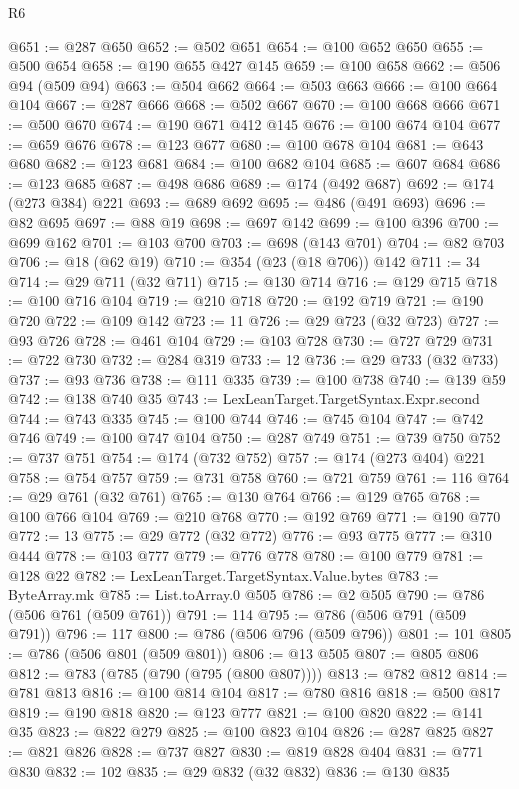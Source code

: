 \begin{lexlean}{R6}
\begin{coremodule}
@651 := @287 @650
@652 := @502 @651
@654 := @100 @652 @650
@655 := @500 @654
@658 := @190 @655 @427 @145
@659 := @100 @658
@662 := @506 @94 (@509 @94)
@663 := @504 @662
@664 := @503 @663
@666 := @100 @664 @104
@667 := @287 @666
@668 := @502 @667
@670 := @100 @668 @666
@671 := @500 @670
@674 := @190 @671 @412 @145
@676 := @100 @674 @104
@677 := @659 @676
@678 := @123 @677
@680 := @100 @678 @104
@681 := @643 @680
@682 := @123 @681
@684 := @100 @682 @104
@685 := @607 @684
@686 := @123 @685
@687 := @498 @686
@689 := @174 (@492 @687)
@692 := @174 (@273 @384) @221
@693 := @689 @692
@695 := @486 (@491 @693)
@696 := @82 @695
@697 := @88 @19
@698 := @697 @142
@699 := @100 @396
@700 := @699 @162
@701 := @103 @700
@703 := @698 (@143 @701)
@704 := @82 @703
@706 := @18 (@62 @19)
@710 := @354 (@23 (@18 @706)) @142
@711 := 34
@714 := @29 @711 (@32 @711)
@715 := @130 @714
@716 := @129 @715
@718 := @100 @716 @104
@719 := @210 @718
@720 := @192 @719
@721 := @190 @720
@722 := @109 @142
@723 := 11
@726 := @29 @723 (@32 @723)
@727 := @93 @726
@728 := @461 @104
@729 := @103 @728
@730 := @727 @729
@731 := @722 @730
@732 := @284 @319
@733 := 12
@736 := @29 @733 (@32 @733)
@737 := @93 @736
@738 := @111 @335
@739 := @100 @738
@740 := @139 @59
@742 := @138 @740 @35
@743 := LexLeanTarget.TargetSyntax.Expr.second
@744 := @743 @335
@745 := @100 @744
@746 := @745 @104
@747 := @742 @746
@749 := @100 @747 @104
@750 := @287 @749
@751 := @739 @750
@752 := @737 @751
@754 := @174 (@732 @752)
@757 := @174 (@273 @404) @221
@758 := @754 @757
@759 := @731 @758
@760 := @721 @759
@761 := 116
@764 := @29 @761 (@32 @761)
@765 := @130 @764
@766 := @129 @765
@768 := @100 @766 @104
@769 := @210 @768
@770 := @192 @769
@771 := @190 @770
@772 := 13
@775 := @29 @772 (@32 @772)
@776 := @93 @775
@777 := @310 @444
@778 := @103 @777
@779 := @776 @778
@780 := @100 @779
@781 := @128 @22
@782 := LexLeanTarget.TargetSyntax.Value.bytes
@783 := ByteArray.mk
@785 := List.toArray.{0} @505
@786 := @2 @505
@790 := @786 (@506 @761 (@509 @761))
@791 := 114
@795 := @786 (@506 @791 (@509 @791))
@796 := 117
@800 := @786 (@506 @796 (@509 @796))
@801 := 101
@805 := @786 (@506 @801 (@509 @801))
@806 := @13 @505
@807 := @805 @806
@812 := @783 (@785 (@790 (@795 (@800 @807))))
@813 := @782 @812
@814 := @781 @813
@816 := @100 @814 @104
@817 := @780 @816
@818 := @500 @817
@819 := @190 @818
@820 := @123 @777
@821 := @100 @820
@822 := @141 @35
@823 := @822 @279
@825 := @100 @823 @104
@826 := @287 @825
@827 := @821 @826
@828 := @737 @827
@830 := @819 @828 @404
@831 := @771 @830
@832 := 102
@835 := @29 @832 (@32 @832)
@836 := @130 @835

\end{coremodule}
\end{lexlean}
